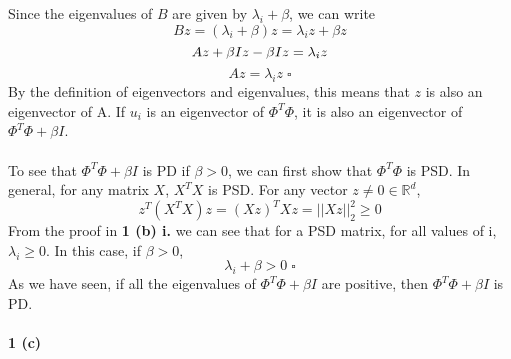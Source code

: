 \documentclass[12 pt]{article}        	%
\begin{document}
Since the eigenvalues of $ B $ are given by $ \lambda_i + \beta $, we can write
\begin{displaymath}
  Bz = (\lambda_i + \beta) z = \lambda_i z + \beta z
\end{displaymath}
\begin{displaymath}
  A z + \beta I z - \beta I z = \lambda_i z  \\
\end{displaymath}
\begin{displaymath}
  A z = \lambda_i z \; \square
\end{displaymath}
By the definition of eigenvectors and eigenvalues, this means that $ z $ is also an eigenvector of A. 
If $ u_i $ is an eigenvector of $ \Phi^T \Phi $, it is also an eigenvector of $ \Phi^T \Phi + \beta I $. \\ \\
To see that $ \Phi^T \Phi + \beta I $ is PD if $ \beta > 0 $, 
we can first show that $ \Phi^T \Phi $ is PSD. In general, for any matrix $ X $, $ X^T X $ is PSD. 
For any vector $ z \neq 0 \in \mathbb{R}^d $, 
\begin{displaymath}
  z^T (X^T X) z = (X z)^T X z = || X z ||_2^2 \geq 0
\end{displaymath}
From the proof in \textbf{1 (b) i.} we can see that for a PSD matrix, for all values of i, $ \lambda_i \geq 0 $. In this case, if $ \beta > 0 $,
\begin{displaymath}
  \lambda_i + \beta > 0 \; \square
\end{displaymath}
As we have seen, if all the eigenvalues of $ \Phi^T \Phi + \beta I $ are positive, then $ \Phi^T \Phi + \beta I $ is PD. \\ \\
\textbf{1 (c)}
\end{document}
